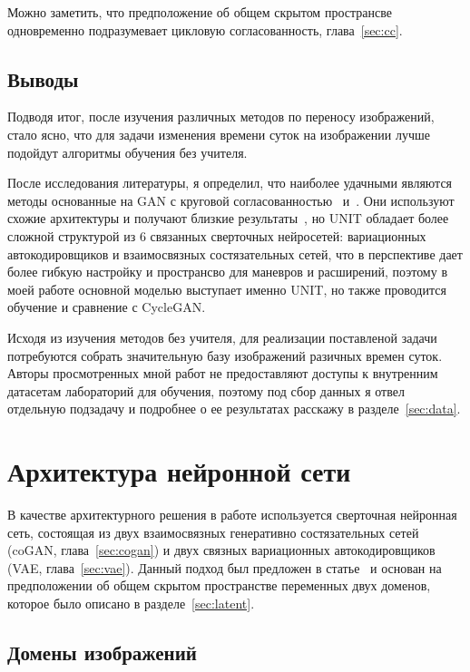 \documentclass[11pt,a4paper]{extarticle}
\begin{document}
{			\noindent
			Можно заметить, что предположение об общем скрытом пространсве одновременно подразумевает цикловую согласованность, глава~\ref{sec:cc}. 


	\subsection{Выводы}

		Подводя итог, после изучения различных методов по переносу изображений, стало ясно, что для задачи изменения времени суток на изображении лучше подойдут алгоритмы обучения без учителя.

		После исследования литературы, я определил, что наиболее удачными являются методы основанные на GAN с круговой согласованностью~\cite[CycleGAN]{CycleGAN} и~\cite[UNIT]{UNIT}.
		Они используют схожие архитектуры и получают близкие результаты~\cite{UNIT_vs_CycleGAN},
		но UNIT обладает более сложной структурой из 6 связанных сверточных нейросетей: вариационных автокодировщиков и взаимосвязных состязательных сетей,
		что в перспективе дает более гибкую настройку и пространсво для маневров и расширений, поэтому в моей работе основной моделью выступает именно UNIT, но также проводится обучение и сравнение с CycleGAN. 

		Исходя из изучения методов без учителя, для реализации поставленой задачи потребуются собрать значительную базу изображений разичных времен суток.
		Авторы просмотренных мной работ не предоставляют доступы к внутренним датасетам лабораторий для обучения, поэтому под сбор данных я отвел отдельную подзадачу и подробнее о ее результатах расскажу в разделе~\ref{sec:data}.


\newpage
\section{Архитектура нейронной сети}\label{sec:model}

	В качестве архитектурного решения в работе используется сверточная нейронная сеть, состоящая из двух взаимосвязных генеративно состязательных сетей (coGAN, глава~\ref{sec:cogan}) и двух связных вариационных автокодировщиков (VAE, глава~\ref{sec:vae}).
	Данный подход был предложен в статье~\cite{UNIT} и основан на предположении об общем скрытом пространстве переменных двух доменов, которое было описано в разделе~\ref{sec:latent}.
	
	\subsection{Домены изображений}\label{sec:model:domains}
		
}
\end{document}
